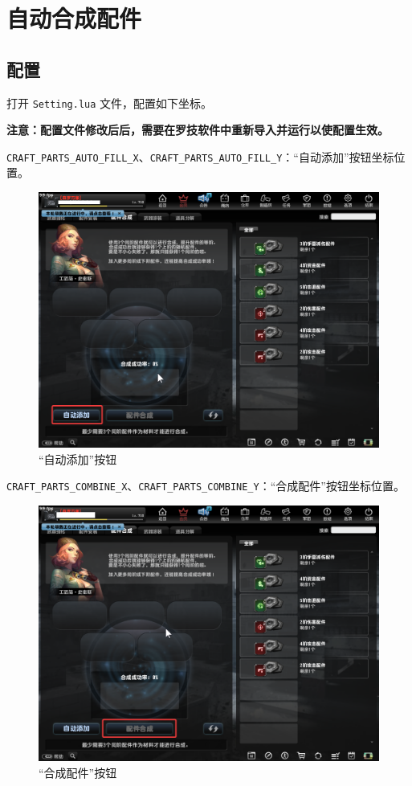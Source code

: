 \section{自动合成配件}

\subsection{配置}

打开 \lstinline{Setting.lua} 文件，配置如下坐标。

\textbf{\color{red}注意：配置文件修改后后，需要在罗技软件中重新导入并运行以使配置生效。}

\lstinline{CRAFT_PARTS_AUTO_FILL_X}、\lstinline{CRAFT_PARTS_AUTO_FILL_Y}：“自动添加”按钮坐标位置。

\begin{figure}[H]
    \Centering
    \includegraphics[width=\textwidth]{docs/assets/auto_fill.png}
    \caption{“自动添加”按钮}
\end{figure}

\lstinline{CRAFT_PARTS_COMBINE_X}、\lstinline{CRAFT_PARTS_COMBINE_Y}：“合成配件”按钮坐标位置。

\begin{figure}[H]
    \Centering
    \includegraphics[width=\textwidth]{docs/assets/combine.png}
    \caption{“合成配件”按钮}
\end{figure}

